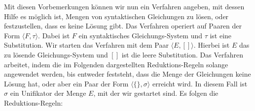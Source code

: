 Mit diesen Vorbemerkungen k\"{o}nnen wir nun ein Verfahren angeben, mit dessen Hilfe es
m\"{o}glich ist, Mengen von syntaktischen Gleichungen zu l\"{o}sen, oder festzustellen, dass es
keine L\"{o}sung gibt.  Das Verfahren operiert auf Paaren der Form 
$\langle F, \tau \rangle$.  Dabei ist $F$ ein syntaktisches Gleichungs-System und
$\tau$ ist eine Substitution.  Wir starten das Verfahren mit dem Paar 
$\langle E, [] \rangle$. Hierbei ist $E$ das zu l\"{o}sende Gleichungs-System und $[]$ ist die leere Substitution.
Das Verfahren arbeitet, indem die im Folgenden
dargestellten Reduktions-Regeln solange angewendet werden, bis entweder feststeht, dass
die Menge der Gleichungen keine L\"{o}sung hat, oder aber ein Paar der Form 
$\langle \{\}, \sigma \rangle$ erreicht wird.  In diesem Fall ist $\sigma$ ein
Unifikator der Menge $E$, mit der wir gestartet sind.  Es folgen die Reduktions-Regeln:
